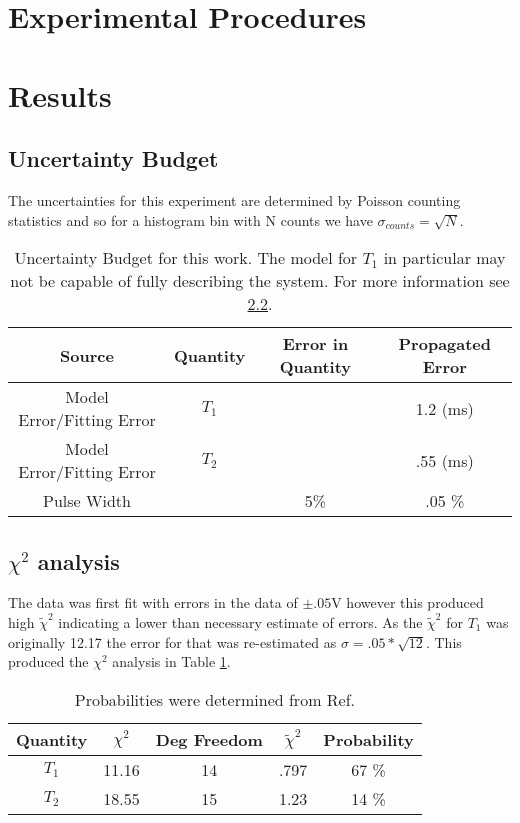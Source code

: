 \documentclass[11pt,letterpaper]{article}
\begin{document}
\section{Experimental Procedures}

\section{Results}

\subsection{Uncertainty Budget}
The uncertainties for this experiment are determined by Poisson counting statistics and so for a histogram bin with N counts we have $\sigma_{counts}=\sqrt{N}$. 
\begin{table}[!h]
	\begin{center} 
		\begin{tabular}{|c|c|c|c|} \hline 
			Source & Quantity&  Error in Quantity  & Propagated Error  \\ \hline \hline
			Model Error/Fitting Error& $T_1$ &  & 1.2 (ms)\\ \hline
			Model Error/Fitting Error& $T_2$ & & .55 (ms)\\ \hline
			Pulse Width&  & 5\% & .05 \%\\
			\hline
		\end{tabular}
        \caption{Uncertainty Budget for this work. The model for $T_1$ in particular may not be capable of fully describing the system. For more information see \ref{sec:ChiSq}.}
	\end{center}
\end{table}

\subsection{$\chi^2$ analysis}
\label{sec:ChiSq}
The data was first fit with errors in the data of $\pm .05$V however this produced high $\tilde{\chi}^2$ indicating a lower than necessary estimate of errors. As the $\tilde{\chi}^2$ for $T_1$ was originally 12.17 the error for that was re-estimated as $\sigma=.05*\sqrt{12}$. This produced the $\chi^2$ analysis in Table \ref{table:ChiSq}.

\begin{table}[!h]

	\begin{center}
		\begin{tabular}{|c|c|c|c|c|} \hline
			Quantity & $\chi^2$&Deg Freedom&$\tilde{\chi}^2$  &  Probability \\ \hline \hline
			$T_1$ & 11.16 & 14 & .797 &  67 \%   \\ \hline
			$T_2$ & 18.55 & 15 & 1.23 & 14 \%   \\ \hline
		\end{tabular} \\
		\caption{Probabilities were determined from Ref. \cite{TaylorError}}
        \label{table:ChiSq}
	\end{center}
\end{table}
\end{document}
